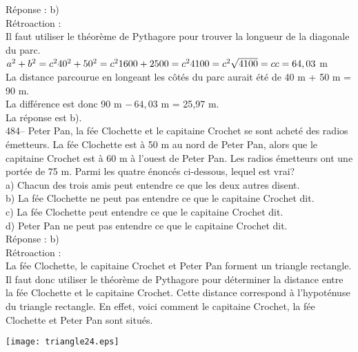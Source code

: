 ﻿\documentclass[letterpaper, 12pt]{article}
\begin{document}
R\'eponse : b)\\

R\'etroaction : \\
Il faut utiliser le th\'eor\`eme de Pythagore pour trouver la longueur de la
diagonale du parc.\\
$a^{2}+b^{2}=c^{2}\\
40^{2}+50^{2}=c^{2}\\
1600+2500=c^{2}\\
4100=c^{2}\\
\sqrt{4100}=c\\
c=64,03$ m\\
La distance parcourue en longeant les c\^ot\'es du parc aurait \'et\'e de 40
m + 50 m = 90 m.\\
La diff\'erence est donc 90 m $-\,64,03$ m = 25,97 m.\\
La r\'eponse est b).\\

484-- Peter Pan, la f\'ee Clochette et le capitaine Crochet se sont achet\'e
des radios \'emetteurs.  La f\'ee Clochette est \`a 50 m au nord de Peter
Pan, alors que le capitaine Crochet est \`a 60 m \`a l'ouest de Peter Pan.
Les radios \'emetteurs ont une port\'ee de 75 m.  Parmi les quatre
\'enonc\'es ci-dessous, lequel est vrai?\\
a) Chacun des trois amis peut entendre ce que les deux autres disent.\\
b) La f\'ee Clochette ne peut pas entendre ce que le capitaine Crochet
dit.\\
c) La f\'ee Clochette peut entendre ce que le capitaine Crochet dit.\\
d) Peter Pan ne peut pas entendre ce que le capitaine Crochet dit.\\

R\'eponse : b)\\

R\'etroaction : \\
La f\'ee Clochette, le capitaine Crochet et Peter Pan forment un triangle
rectangle.  Il faut donc utiliser le th\'eor\`eme de Pythagore pour
d\'eterminer la distance entre la f\'ee Clochette et le capitaine Crochet.
Cette distance correspond \`a l'hypot\'enuse du triangle rectangle.  En
effet, voici comment le capitaine Crochet, la f\'ee Clochette et Peter Pan
sont situ\'es.\\
    \begin{center}
    \texttt{[image: triangle24.eps]}
    \end{center}
\end{document}
